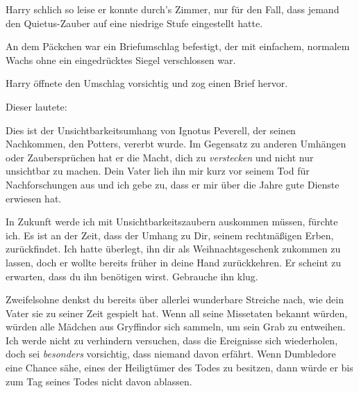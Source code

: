 Harry schlich so leise er konnte durch's Zimmer, nur für den Fall, dass jemand den Quietus-Zauber auf eine niedrige Stufe eingestellt hatte.

An dem Päckchen war ein Briefumschlag befestigt, der mit einfachem, normalem Wachs ohne ein eingedrücktes Siegel verschlossen war.

Harry öffnete den Umschlag vorsichtig und zog einen Brief hervor.

Dieser lautete:

\begin{writtenNote}
Dies ist der Unsichtbarkeitsumhang von Ignotus Peverell, der seinen Nachkommen, den Potters, vererbt wurde. Im Gegensatz zu anderen Umhängen oder Zaubersprüchen hat er die Macht, dich zu \emph{verstecken} und nicht nur unsichtbar zu machen. Dein Vater lieh ihn mir kurz vor seinem Tod für Nachforschungen aus und ich gebe zu, dass er mir über die Jahre gute Dienste erwiesen hat.

In Zukunft werde ich mit Unsichtbarkeitszaubern auskommen müssen, fürchte ich. Es ist an der Zeit, dass der Umhang zu Dir, seinem rechtmäßigen Erben, zurückfindet. Ich hatte überlegt, ihn dir als Weihnachtsgeschenk zukommen zu lassen, doch er wollte bereits früher in deine Hand zurückkehren. Er scheint zu erwarten, dass du ihn benötigen wirst. Gebrauche ihn klug.

Zweifelsohne denkst du bereits über allerlei wunderbare Streiche nach, wie dein Vater sie zu seiner Zeit gespielt hat. Wenn all seine Missetaten bekannt würden, würden alle Mädchen aus Gryffindor sich sammeln, um sein Grab zu entweihen. Ich werde nicht zu verhindern versuchen, dass die Ereignisse sich wiederholen, doch sei \emph{besonders} vorsichtig, dass niemand davon erfährt. Wenn Dumbledore eine Chance sähe, eines der Heiligtümer des Todes zu besitzen, dann würde er bis zum Tag seines Todes nicht davon ablassen.


\end{writtenNote}
